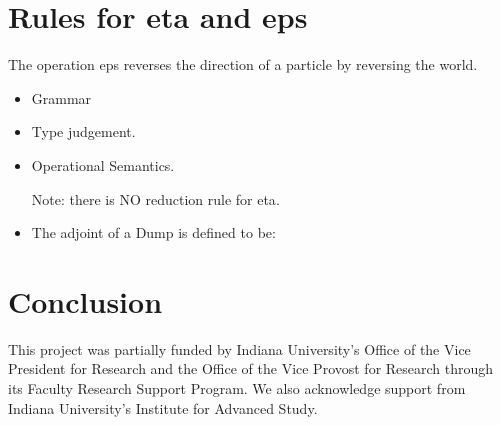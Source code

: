 \documentclass[preprint]{sigplanconf}
\begin{document}
\section{Rules for {{eta}} and {{eps}} }

The operation {{eps}} reverses the direction of a particle by reversing the world. 

\begin{itemize}
\item Grammar

\item
Type judgement.


\item
Operational Semantics.

Note: there is NO reduction rule for {{eta}}. 

\item
The adjoint of a Dump is defined to be:

\end{itemize}

\section{Conclusion}

\acks This project was partially funded by Indiana University's Office of the
Vice President for Research and the Office of the Vice Provost for Research
through its Faculty Research Support Program.  We also acknowledge support
from Indiana University's Institute for Advanced Study.

\begin{small}


\end{small}
\end{document}
